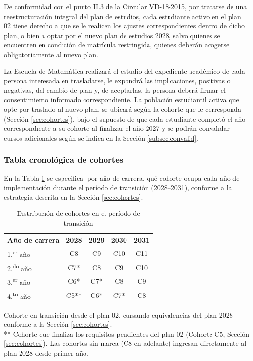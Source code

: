 De conformidad con el punto II.3 de la Circular VD-18-2015, por tratarse de una reestructuración integral del plan de estudios, cada estudiante activo en el plan 02 tiene derecho a que se le realicen los ajustes correspondientes dentro de dicho plan, o bien a optar por el nuevo plan de estudios 2028, salvo quienes se encuentren en condición de matrícula restringida, quienes deberán acogerse obligatoriamente al nuevo plan. 

La Escuela de Matemática realizará el estudio del expediente académico de cada persona interesada en trasladarse, le expondrá las implicaciones, positivas o negativas, del cambio de plan y, de aceptarlas, la persona deberá firmar el consentimiento informado correspondiente. La población estudiantil activa que opte por traslado al nuevo plan, se ubicará según la cohorte que le corresponda (Sección \ref{sec:cohortes}), bajo el supuesto de que cada estudiante completó el año correspondiente a su cohorte al finalizar el año 2027 y se podrán convalidar cursos adicionales según se indica en la Sección \ref{subsec:convalid}. 

\subsubsection{Tabla cronológica de cohortes}
En la Tabla \ref{tab:cronologia-cohortes} se especifica, por año de carrera, qué cohorte ocupa cada año de implementación durante el período de transición (2028--2031), conforme a la estrategia descrita en la Sección \ref{sec:cohortes}.

\begin{table}[h!]
\centering
\caption{Distribución de cohortes en el período de transición}
\label{tab:cronologia-cohortes}
\begin{tabular}{|l|c|c|c|c|}
\hline
\rowcolor[HTML]{00C0F3}
Año de carrera & 2028 & 2029 & 2030 & 2031 \\ \hline
1.\textsuperscript{er} año & C8 & C9 & C10 & C11 \\ \hline
2.\textsuperscript{do} año & C7* & C8 & C9 & C10 \\ \hline
3.\textsuperscript{er} año & C6* & C7* & C8 & C9 \\ \hline
4.\textsuperscript{to} año & C5** & C6* & C7* & C8 \\ \hline
\end{tabular}

\vspace{0.3em}
{\small * Cohorte en transición desde el plan 02, cursando equivalencias del plan 2028 conforme a la Sección \ref{sec:cohortes}. \\{}
** Cohorte que finaliza los requisitos pendientes del plan 02 (Cohorte C5, Sección \ref{sec:cohortes}). Las cohortes sin marca (C8 en adelante) ingresan directamente al plan 2028 desde primer año.}
\end{table}
